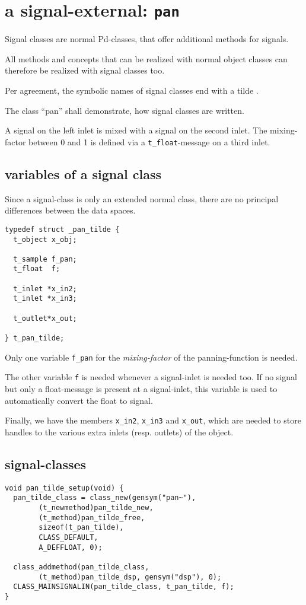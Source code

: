 \documentclass[12pt, a4paper,english,titlepage]{article}
\begin{document}
\section{a signal-external: {\tt pan\pdtilde}}
Signal classes are normal Pd-classes, that offer additional methods for signals.


All methods and concepts that can be realized with normal object classes can
therefore be realized with signal classes too.

Per agreement, the symbolic names of signal classes end with a tilde \pdtilde.

The class ``pan\pdtilde'' shall demonstrate, how signal classes are written.

A signal on the left inlet is mixed with a signal on the second inlet.
The mixing-factor between 0 and 1 is defined via a \verb+t_float+-message
on a third inlet.

\subsection{variables of a signal class}
Since a signal-class is only an extended normal class,
there are no principal differences between the data spaces.

\begin{verbatim}
typedef struct _pan_tilde {
  t_object x_obj;

  t_sample f_pan;
  t_float  f;

  t_inlet *x_in2;
  t_inlet *x_in3;

  t_outlet*x_out;

} t_pan_tilde;
\end{verbatim}

Only one variable \verb+f_pan+ for the {\em mixing-factor} of the panning-function is needed.

The other variable \verb+f+ is needed whenever a signal-inlet is needed too.
If no signal but only a float-message is present at a signal-inlet, this
variable is used to automatically convert the float to signal.

Finally, we have the members \verb+x_in2+, \verb+x_in3+ and \verb+x_out+,
which are needed to store handles to the various extra inlets (resp. outlets) of the object.

\subsection{signal-classes}

\begin{verbatim}
void pan_tilde_setup(void) {
  pan_tilde_class = class_new(gensym("pan~"),
        (t_newmethod)pan_tilde_new,
        (t_method)pan_tilde_free,
        sizeof(t_pan_tilde),
        CLASS_DEFAULT, 
        A_DEFFLOAT, 0);

  class_addmethod(pan_tilde_class,
        (t_method)pan_tilde_dsp, gensym("dsp"), 0);
  CLASS_MAINSIGNALIN(pan_tilde_class, t_pan_tilde, f);
}
\end{verbatim}
\end{document}
